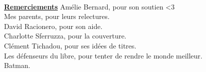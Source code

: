 \begin{titlepage}
~\vfill
\begin{center}
\begin{minipage}[c]{15cm}
	\begin{center}
	{\large \textbf{\underline{Remerciements}}}
	\linebreak
	\linebreak
	Amélie Bernard, pour son soutien <3\\
	Mes parents, pour leurs relectures.\\
	David Racionero, pour son aide.\\
	Charlotte Sferruzza, pour la couverture.\\
	Clément Tichadou, pour ses idées de titres.\\
	Les défenseurs du libre, pour tenter de rendre le monde meilleur.\\
	Batman.
	\end{center}
\end{minipage}

\vspace{240pt}


\end{center}
\end{titlepage}

